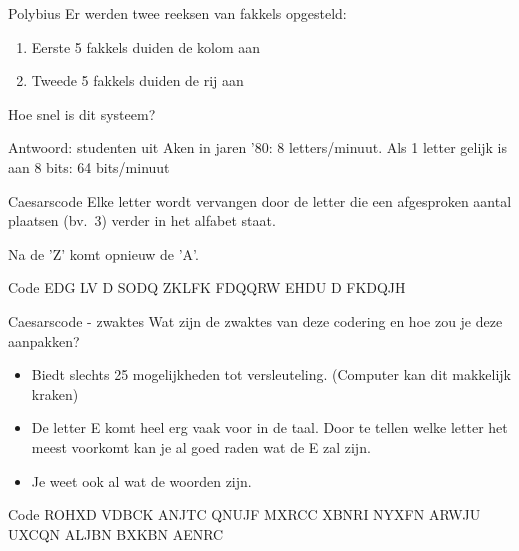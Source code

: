 \documentclass{beamer}
\begin{document}

\begin{frame}{Polybius}
	Er werden twee reeksen van fakkels opgesteld:
	\begin{enumerate}
		\item Eerste 5 fakkels duiden de kolom aan
		\item Tweede 5 fakkels duiden de rij aan
	\end{enumerate}
    
    \pause
    Hoe snel is dit systeem?\pause
    
    Antwoord: studenten uit Aken in jaren '80: 8 letters/minuut.\pause
    Als 1 letter gelijk is aan 8 bits: 64 bits/minuut
    
\end{frame}



\begin{frame}[fragile]{Caesarscode}
	Elke letter wordt vervangen door de letter die een afgesproken aantal plaatsen (bv.\ 3) verder in het alfabet staat. 
	
	Na de 'Z' komt opnieuw de 'A'.
	
	\begin{block}{Code}
	EDG LV D SODQ ZKLFK FDQQRW EHDU D FKDQJH
	\end{block}
\end{frame}



\begin{frame}[fragile]{Caesarscode - zwaktes}
	Wat zijn de zwaktes van deze codering en hoe zou je deze aanpakken?
	\pause
	\begin{itemize}
		\item Biedt slechts 25 mogelijkheden tot versleuteling. (Computer kan dit makkelijk kraken)
		\item De letter E komt heel erg vaak voor in de taal. 
		Door te tellen welke letter het meest voorkomt kan je al goed raden wat de E zal zijn. 
		\item Je weet ook al wat de woorden zijn.
	\end{itemize}

\begin{center}
\begin{block}{Code}
ROHXD VDBCK ANJTC QNUJF MXRCC XBNRI
NYXFN ARWJU UXCQN ALJBN BXKBN AENRC
\end{block}
\end{center}
\end{frame}
\end{document}

